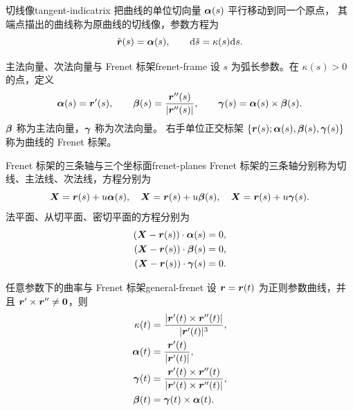 \begin{definition}{切线像}{tangent-indicatrix}
把曲线的单位切向量 $\boldsymbol{\alpha}(s)$ 平行移动到同一个原点，
其端点描出的曲线称为原曲线的切线像，参数方程为
\[
\tilde{\boldsymbol{r}}(s)=\boldsymbol{\alpha}(s),\qquad
\mathrm{d}\tilde s=\kappa(s)\mathrm{d} s.
\]
\end{definition}

\begin{definition}{主法向量、次法向量与 Frenet 标架}{frenet-frame}
设 $s$ 为弧长参数。在 $\kappa(s)>0$ 的点，定义
\[
\boldsymbol{\alpha}(s)=\boldsymbol{r}'(s),\qquad
\boldsymbol{\beta}(s)=\frac{\boldsymbol{r}''(s)}{|\boldsymbol{r}''(s)|},\qquad
\boldsymbol{\gamma}(s)=\boldsymbol{\alpha}(s)\times\boldsymbol{\beta}(s).
\]
$\boldsymbol{\beta}$ 称为主法向量，$\boldsymbol{\gamma}$ 称为次法向量。
右手单位正交标架 $\{\boldsymbol{r}(s);\boldsymbol{\alpha}(s),\boldsymbol{\beta}(s),\boldsymbol{\gamma}(s)\}$
称为曲线的 Frenet 标架。
\end{definition}

\begin{definition}{Frenet 标架的三条轴与三个坐标面}{frenet-planes}
Frenet 标架的三条轴分别称为切线、主法线、次法线，方程分别为
\[
\boldsymbol{X}=\boldsymbol{r}(s)+u\boldsymbol{\alpha}(s),\quad
\boldsymbol{X}=\boldsymbol{r}(s)+u\boldsymbol{\beta}(s),\quad
\boldsymbol{X}=\boldsymbol{r}(s)+u\boldsymbol{\gamma}(s).
\]
法平面、从切平面、密切平面的方程分别为
\[
\begin{aligned}
(\boldsymbol{X}-\boldsymbol{r}(s))\cdot\boldsymbol{\alpha}(s)&=0,\\
(\boldsymbol{X}-\boldsymbol{r}(s))\cdot\boldsymbol{\beta}(s)&=0,\\
(\boldsymbol{X}-\boldsymbol{r}(s))\cdot\boldsymbol{\gamma}(s)&=0.
\end{aligned}
\]
\end{definition}

\begin{proposition}{任意参数下的曲率与 Frenet 标架}{general-frenet}
设 $\boldsymbol{r}=\boldsymbol{r}(t)$ 为正则参数曲线，并且 $\boldsymbol{r}'\times\boldsymbol{r}''\neq\boldsymbol{0}$，则
\[
\begin{aligned}
\kappa(t)&=\frac{|\boldsymbol{r}'(t)\times\boldsymbol{r}''(t)|}{|\boldsymbol{r}'(t)|^3},\\
\boldsymbol{\alpha}(t)&=\frac{\boldsymbol{r}'(t)}{|\boldsymbol{r}'(t)|},\\
\boldsymbol{\gamma}(t)&=\frac{\boldsymbol{r}'(t)\times\boldsymbol{r}''(t)}{|\boldsymbol{r}'(t)\times\boldsymbol{r}''(t)|},\\
\boldsymbol{\beta}(t)&=\boldsymbol{\gamma}(t)\times\boldsymbol{\alpha}(t).
\end{aligned}
\]
\end{proposition}

